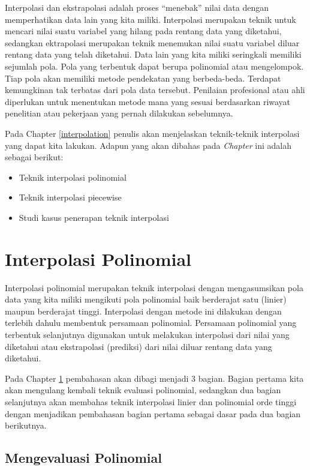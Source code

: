\documentclass[
]{book}
\providecommand{\tightlist}{%
  \setlength{\itemsep}{0pt}\setlength{\parskip}{0pt}}
\theoremstyle{definition}
\theoremstyle{definition}
\theoremstyle{definition}
\theoremstyle{definition}
\theoremstyle{remark}
\begin{document}
Interpolasi dan ekstrapolasi adalah proses ``menebak'' nilai data dengan memperhatikan data lain yang kita miliki. Interpolasi merupakan teknik untuk mencari nilai suatu variabel yang hilang pada rentang data yang diketahui, sedangkan ektrapolasi merupakan teknik menemukan nilai suatu variabel diluar rentang data yang telah diketahui. Data lain yang kita miliki seringkali memiliki sejumlah pola. Pola yang terbentuk dapat berupa polinomial atau mengelompok. Tiap pola akan memiliki metode pendekatan yang berbeda-beda. Terdapat kemungkinan tak terbatas dari pola data tersebut. Penilaian profesional atau ahli diperlukan untuk menentukan metode mana yang sesuai berdasarkan riwayat penelitian atau pekerjaan yang pernah dilakukan sebelumnya.

Pada Chapter \ref{interpolation} penulis akan menjelaskan teknik-teknik interpolasi yang dapat kita lakukan. Adapun yang akan dibahas pada \emph{Chapter} ini adalah sebagai berikut:

\begin{itemize}
\tightlist
\item
  Teknik interpolasi polinomial
\item
  Teknik interpolasi piecewise
\item
  Studi kasus penerapan teknik interpolasi
\end{itemize}

\hypertarget{poliinterpolation}{%
\section{Interpolasi Polinomial}\label{poliinterpolation}}

Interpolasi polinomial merupakan teknik interpolasi dengan mengasumsikan pola data yang kita miliki mengikuti pola polinomial baik berderajat satu (linier) maupun berderajat tinggi. Interpolasi dengan metode ini dilakukan dengan terlebih dahulu membentuk persamaan polinomial. Persamaan polinomial yang terbentuk selanjutnya digunakan untuk melakukan interpolasi dari nilai yang diketahui atau ekstrapolasi (prediksi) dari nilai diluar rentang data yang diketahui.

Pada Chapter \ref{poliinterpolation} pembahasan akan dibagi menjadi 3 bagian. Bagian pertama kita akan mengulang kembali teknik evaluasi polinomial, sedangkan dua bagian selanjutnya akan membahas teknik interpolasi linier dan polinomial orde tinggi dengan menjadikan pembahasan bagian pertama sebagai dasar pada dua bagian berikutnya.

\hypertarget{mengevaluasi-polinomial}{%
\subsection{Mengevaluasi Polinomial}\label{mengevaluasi-polinomial}}
\end{document}

